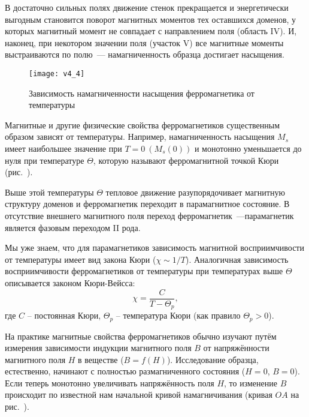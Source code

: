  В достаточно сильных полях движение стенок прекращается и энергетически выгодным становится поворот магнитных моментов тех оставшихся доменов, у которых магнитный момент не совпадает с направлением поля (область IV). И, наконец, при некотором значении поля (участок V) все магнитные моменты выстраиваются по полю~--- намагниченность образца достигает насыщения.

\begin{wrapfigure}[12]{r}{0.35\textwidth}
	\texttt{[image: v4\_4]}
	\caption{Зависимость намагниченности насыщения ферромагнетика от температуры}
\end{wrapfigure}

Магнитные и другие физические свойства ферромагнетиков существенным образом зависят от температуры. Например, намагниченность насыщения $M_s$ имеет наибольшее значение при $T = 0~(M_s (0))$ и монотонно уменьшается до нуля при температуре $\Theta$, которую называют ферромагнитной точкой Кюри (рис.~). 


Выше  этой температуры $\Theta$ тепловое движение разупорядочивает магнитную структуру доменов и ферромагнетик переходит в парамагнитное состояние. В отсутствие внешнего магнитного поля переход ферромагнетик~---парамагнетик является фазовым переходом II рода.

Мы уже знаем, что для парамагнетиков зависимость магнитной восприимчивости от температуры имеет вид закона Кюри ($\chi \sim 1/T$). Аналогичная зависимость восприимчивости ферромагнетиков от температуры при температурах выше $\Theta$ описывается законом Кюри-Вейсса:
\begin{equation*}
	\chi = \frac{C}{T - \Theta_p},
\end{equation*}
где $C$ -- постоянная Кюри, $\Theta_p$ -- температура Кюри (как правило $\Theta_p > 0$).

На практике магнитные свойства ферромагнетиков обычно изучают путём измерения зависимости индукции магнитного поля $B$ от напряжённости магнитного поля $H$ в веществе ($B = f(H)$). Исследование образца, естественно, начинают с полностью размагниченного состояния ($H = 0$, $B = 0$). Если теперь монотонно увеличивать напряжённость поля $H$, то изменение $B$ происходит по известной нам начальной кривой намагничивания (кривая $OA$ на рис.~).

